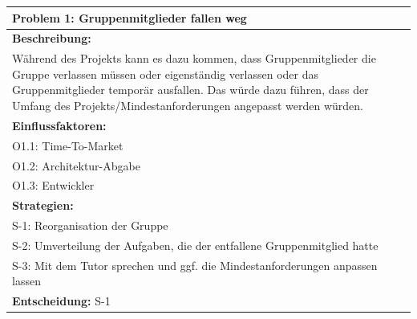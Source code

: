 \documentclass[fontsize=12pt,paper=a4,twoside]{scrartcl}
\begin{document}
\begin{longtable}{|p{15cm}|}
\hline
Problem 1: Gruppenmitglieder fallen weg                                                                          
\\ \hline                                                                                                                                                                                                                                                                                                                                                                                                                                                                                                                                                        
\textbf{Beschreibung:} \\
Während des Projekts kann es dazu kommen, dass Gruppenmitglieder die Gruppe verlassen müssen oder eigenständig verlassen oder
das Gruppenmitglieder temporär ausfallen.
Das würde dazu führen, dass der Umfang des Projekts/Mindestanforderungen angepasst werden würden.
\\ \hline
\textbf{Einflussfaktoren:} \\
O1.1: Time-To-Market \\
O1.2: Architektur-Abgabe \\
O1.3: Entwickler
\\ \hline
\textbf{Strategien:} \\
S-1: Reorganisation der Gruppe \\
S-2: Umverteilung der Aufgaben, die der entfallene Gruppenmitglied hatte \\
S-3: Mit dem Tutor sprechen und ggf. die Mindestanforderungen anpassen lassen
 \\ \hline
 \textbf{Entscheidung:} S-1
\\ \hline
\end{longtable}
\end{document}
